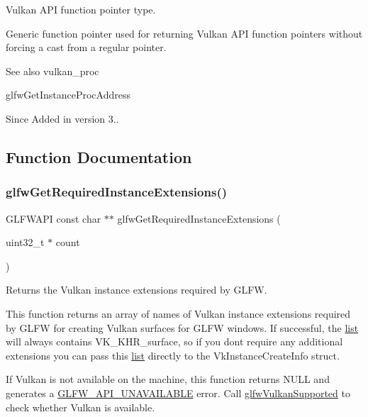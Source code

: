 Vulkan A\+PI function pointer type. 

Generic function pointer used for returning Vulkan A\+PI function pointers without forcing a cast from a regular pointer.

\begin{DoxySeeAlso}{See also}
vulkan\+\_\+proc 

glfw\+Get\+Instance\+Proc\+Address
\end{DoxySeeAlso}
\begin{DoxySince}{Since}
Added in version 3.. 
\end{DoxySince}


\subsection{Function Documentation}
\mbox{\label{group__vulkan_gada152edc5bbbd0c2138728878632fd9c}} 
\subsubsection{\texorpdfstring{glfw\+Get\+Required\+Instance\+Extensions()}{glfwGetRequiredInstanceExtensions()}}
{\footnotesize\ttfamily G\+L\+F\+W\+A\+PI const char $\ast$$\ast$ glfw\+Get\+Required\+Instance\+Extensions (\begin{DoxyParamCaption}\item[{uint32\+\_\+t $\ast$}]{count }\end{DoxyParamCaption})}



Returns the Vulkan instance extensions required by G\+L\+FW. 

This function returns an array of names of Vulkan instance extensions required by G\+L\+FW for creating Vulkan surfaces for G\+L\+FW windows. If successful, the \hyperlink{protocollist-p}{list} will always contains {\ttfamily V\+K\+\_\+\+K\+H\+R\+\_\+surface}, so if you don\textquotesingle{}t require any additional extensions you can pass this \hyperlink{protocollist-p}{list} directly to the {\ttfamily Vk\+Instance\+Create\+Info} struct.

If Vulkan is not available on the machine, this function returns {\ttfamily N\+U\+LL} and generates a \hyperlink{group__errors_ga56882b290db23261cc6c053c40c2d08e}{G\+L\+F\+W\+\_\+\+A\+P\+I\+\_\+\+U\+N\+A\+V\+A\+I\+L\+A\+B\+LE} error. Call \hyperlink{group__vulkan_ga72e7c3757d9ff2333181a5569bb7c403}{glfw\+Vulkan\+Supported} to check whether Vulkan is available.

